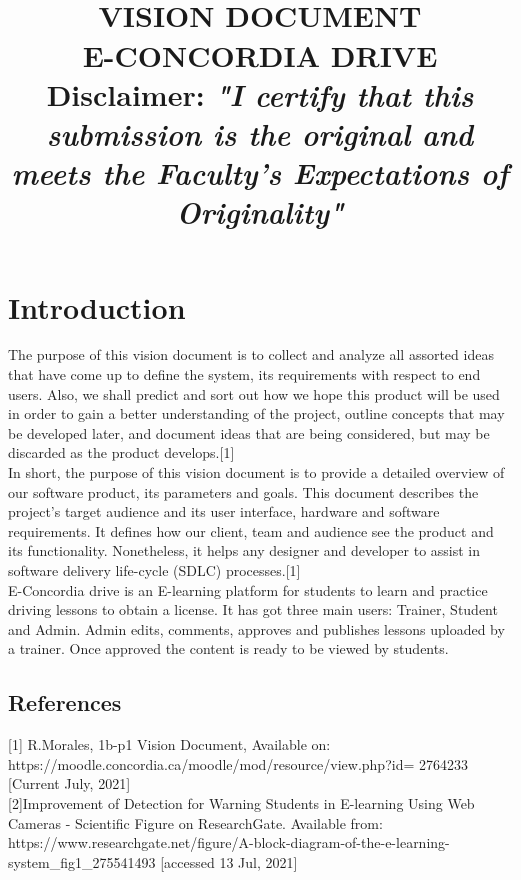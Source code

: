\documentclass{article}
\title{\normalsize \texts{SOEN 6481 Summer 2021}\\ [1.0cm]
\large \textbf{\uppercase{Vision Document}}\\
\large \textbf{\uppercase{E-Concordia Drive}}
\normalsize \vspace*{2\baselineskip}\\
\textbf{Disclaimer:}
\textit{"I certify that this submission is the original and meets the Faculty's Expectations of Originality"}
}
\begin{document}
\maketitle

\tableofcontents
\clearpage


\section{Introduction}
The purpose of this vision document is to collect and analyze all assorted ideas that have come up to define the system, its requirements with respect to end users. Also, we shall predict and sort out how we hope this product will be used in order to gain a better understanding of the project, outline concepts that may be developed later, and document ideas that are being considered, but may be discarded as the product develops.[1]\normalsize\vspace*{1\baselineskip}\\
In short, the purpose of this vision document is to provide a detailed overview of our software product, its parameters and goals. This document describes the project's target audience and its user interface, hardware and software requirements. It defines how our client, team and audience see the product and its functionality. Nonetheless, it helps any designer and developer to assist in software delivery life-cycle (SDLC) processes.[1]\normalsize\vspace*{1\baselineskip}\\
E-Concordia drive is an E-learning platform for students to learn and practice driving lessons to obtain a license. It has got three main users: Trainer, Student and Admin.
Admin edits, comments, approves and publishes  lessons uploaded by a trainer.
Once approved the content is ready to be viewed by students.

\subsection{References}
[1] R.Morales, 1b-p1 Vision Document, Available on:
https://moodle.concordia.ca/moodle/mod/resource/view.php?id= 2764233 [Current July, 2021]\\

[2]Improvement of Detection for Warning Students in E-learning Using Web Cameras - Scientific Figure on ResearchGate. Available from: https://www.researchgate.net/figure/A-block-diagram-of-the-e-learning-system\_fig1\_275541493 [accessed 13 Jul, 2021]
\end{document}
